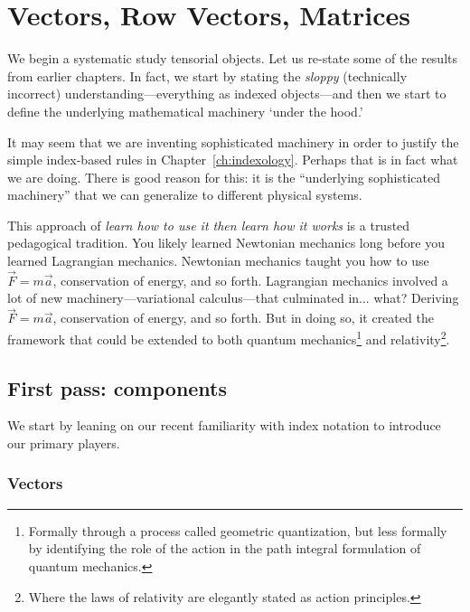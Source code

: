 
\chapter{Vectors, Row Vectors, Matrices}
\label{ch:vectors:row:matrices:in:indices}

We begin a systematic study tensorial objects. Let us re-state some of the results from earlier chapters. In fact, we start by stating the \emph{sloppy} (technically incorrect) understanding---everything as indexed objects---and then we start to define the underlying mathematical machinery `under the hood.'

It may seem that we are inventing sophisticated machinery in order to justify the simple index-based rules in Chapter~\ref{ch:indexology}. Perhaps that is in fact what we are doing. There is good reason for this: it is the ``underlying sophisticated machinery'' that we can generalize to different physical systems.

\begin{example}
This approach of \emph{learn how to use it then learn how it works} is a trusted pedagogical tradition. You likely learned Newtonian mechanics long before you learned Lagrangian mechanics. Newtonian mechanics taught you how to use $\vec{F} = m\vec{a}$, conservation of energy, and so forth. Lagrangian mechanics involved a lot of new machinery---variational calculus---that culminated in... what? Deriving $\vec{F}=m\vec{a}$, conservation of energy, and so forth. But in doing so, it created the framework that could be extended to both quantum mechanics\footnote{Formally through a process called geometric quantization, but less formally by identifying the role of the action in the path integral formulation of quantum mechanics.} and relativity\footnote{Where the laws of relativity are elegantly stated as action principles.}.
\end{example} 

\section{First pass: components}
\label{sec:component:notation}

We start by leaning on our recent familiarity with index notation to introduce our primary players.

\subsection{Vectors}


